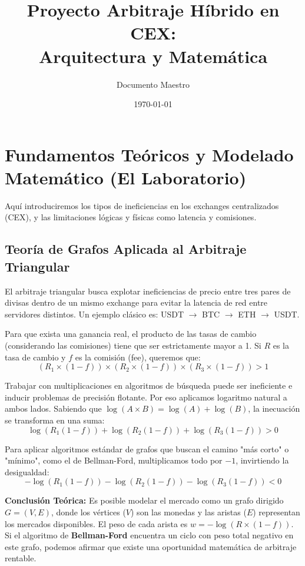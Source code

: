 \documentclass[11pt,a4paper]{article}
\title{Proyecto Arbitraje Híbrido en CEX:\\Arquitectura y Matemática}
\author{Documento Maestro}
\date{\today}
\begin{document}
\maketitle
\tableofcontents
\newpage

\section{Fundamentos Teóricos y Modelado Matemático (El Laboratorio)}

Aquí introduciremos los tipos de ineficiencias en los exchanges centralizados (CEX), y las limitaciones lógicas y físicas como latencia y comisiones.

\subsection{Teoría de Grafos Aplicada al Arbitraje Triangular}

El arbitraje triangular busca explotar ineficiencias de precio entre tres pares de divisas dentro de un mismo exchange para evitar la latencia de red entre servidores distintos. Un ejemplo clásico es: USDT $\to$ BTC $\to$ ETH $\to$ USDT.

Para que exista una ganancia real, el producto de las tasas de cambio (considerando las comisiones) tiene que ser estrictamente mayor a 1.
Si $R$ es la tasa de cambio y $f$ es la comisión (fee), queremos que:
\begin{equation}
(R_1 \times (1 - f)) \times (R_2 \times (1 - f)) \times (R_3 \times (1 - f)) > 1
\end{equation}

Trabajar con multiplicaciones en algoritmos de búsqueda puede ser ineficiente e inducir problemas de precisión flotante. Por eso aplicamos logaritmo natural a ambos lados. Sabiendo que $\log(A \times B) = \log(A) + \log(B)$, la inecuación se transforma en una suma:
\begin{equation}
\log(R_1(1-f)) + \log(R_2(1-f)) + \log(R_3(1-f)) > 0
\end{equation}

Para aplicar algoritmos estándar de grafos que buscan el camino "más corto" o "mínimo", como el de Bellman-Ford, multiplicamos todo por $-1$, invirtiendo la desigualdad:
\begin{equation}
-\log(R_1(1-f)) - \log(R_2(1-f)) - \log(R_3(1-f)) < 0
\end{equation}

\textbf{Conclusión Teórica:} 
Es posible modelar el mercado como un grafo dirigido $G = (V, E)$, donde los vértices ($V$) son las monedas y las aristas ($E$) representan los mercados disponibles. El peso de cada arista es $w = -\log(R \times (1 - f))$.
Si el algoritmo de \textbf{Bellman-Ford} encuentra un ciclo con peso total negativo en este grafo, podemos afirmar que existe una oportunidad matemática de arbitraje rentable.
\end{document}
